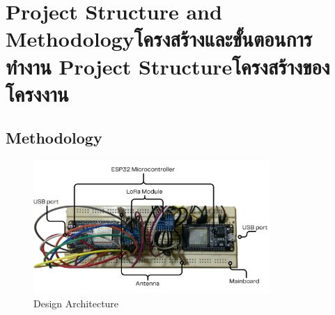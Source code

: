 \chapter{\ifproject%
\ifenglish Project Structure and Methodology\else โครงสร้างและขั้นตอนการทำงาน\fi
\else%
\ifenglish Project Structure\else โครงสร้างของโครงงาน\fi
\fi
}


\makeatletter


\makeatother

\section{Methodology}

\begin{figure}
\begin{center}
\includegraphics[width=0.8\textwidth]{Architecture.jpg}
\end{center}
\caption[Picture]{Design Architecture}
\label{fig:walrus}
\end{figure}

